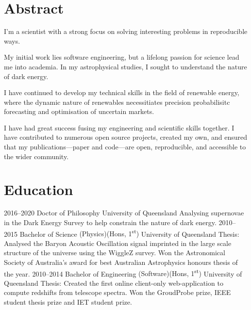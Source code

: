 
\section{Abstract}

I'm a scientist with a strong focus on solving interesting problems in reproducible ways.

My initial work lies software engineering, but a lifelong passion for science lead me 
into academia. In my astrophysical studies, I sought to understand the nature of dark energy.

I have continued to develop my technical skills in the field of renewable energy, where the dynamic
nature of renewables necessitiates precision probabilisitc forecasting and optimisation
of uncertain markets.

I have had great success fusing my engineering and scientific skills together. I have contributed to 
numerous open source projects, created my own, and ensured that my publications---paper and code---are 
open, reproducible, and accessible to the wider community.


\section{Education}

\begin{entrylist}
\entry
{2016--2020}
{Doctor of Philosophy}
{University of Queensland}
{Analysing supernovae in the Dark Energy Survey to help constrain the nature of dark energy.}
\entry
{2010--2015}
{Bachelor of Science {\normalfont (Physics)(Hons, 1\textsuperscript{st})}}
{University of Queensland}
{Thesis: Analysed the Baryon Acoustic Oscillation signal imprinted in the large scale structure of the universe using the WiggleZ survey. Won the Astronomical Society of Australia's award for best Australian Astrophysics honours thesis of the year.}
\entry
{2010--2014}
{Bachelor of Engineering {\normalfont (Software)(Hons, 1\textsuperscript{st})}}
{University of Queensland}
{Thesis: Created the first online client-only web-application to compute redshifts from telescope spectra. Won the GroudProbe prize, IEEE student thesis prize and IET student prize.}

\end{entrylist}

